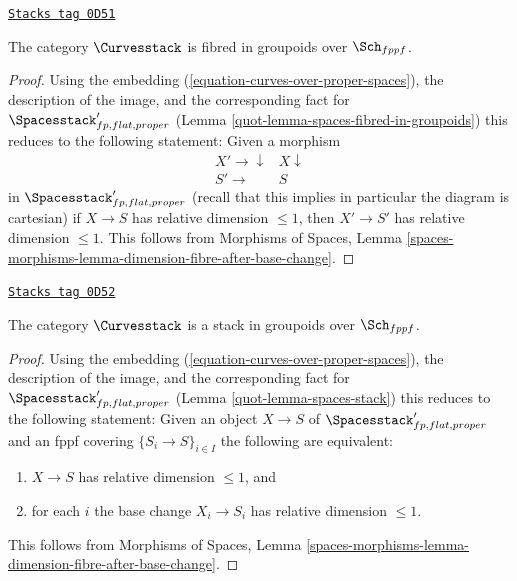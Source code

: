\begin{lemma}
\label{quot-lemma-curves-fibred-in-groupoids}
\href{https://stacks.math.columbia.edu/tag/0D51}{\texttt{Stacks tag 0D51}}

The category $\Curvesstack$ is fibred in groupoids over $\Sch_{fppf}$.
\end{lemma}

\begin{proof}

Using the embedding (\ref{equation-curves-over-proper-spaces}),
the description of the image, and
the corresponding fact for $\Spacesstack'_{fp, flat, proper}$
(Lemma \ref{quot-lemma-spaces-fibred-in-groupoids})
this reduces to the following statement: Given a morphism
$$
\begin{array}{cc}X' \longrightarrow\downarrow & X \downarrow \\ S' \longrightarrow & S\end{array}
$$
in $\Spacesstack'_{fp, flat, proper}$ (recall that this implies
in particular the diagram is cartesian)
if $X \to S$ has relative dimension $\leq 1$, then $X' \to S'$
has relative dimension $\leq 1$.
This follows from Morphisms of Spaces, Lemma
\ref{spaces-morphisms-lemma-dimension-fibre-after-base-change}.
\end{proof}

\begin{lemma}
\label{quot-lemma-curves-stack}
\href{https://stacks.math.columbia.edu/tag/0D52}{\texttt{Stacks tag 0D52}}

The category $\Curvesstack$ is a stack in groupoids over $\Sch_{fppf}$.
\end{lemma}

\begin{proof}

Using the embedding (\ref{equation-curves-over-proper-spaces}),
the description of the image, and
the corresponding fact for $\Spacesstack'_{fp, flat, proper}$
(Lemma \ref{quot-lemma-spaces-stack})
this reduces to the following statement: Given an object
$X \to S$ of $\Spacesstack'_{fp, flat, proper}$
and an fppf covering $\{S_i \to S\}_{i \in I}$
the following are equivalent:
\begin{enumerate}
\item $X \to S$ has relative dimension $\leq 1$, and
\item for each $i$ the base change $X_i \to S_i$
has relative dimension $\leq 1$.
\end{enumerate}
This follows from Morphisms of Spaces, Lemma
\ref{spaces-morphisms-lemma-dimension-fibre-after-base-change}.
\end{proof}


